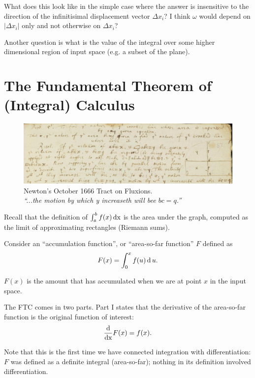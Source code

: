 \documentclass[12pt]{article}
\renewcommand{\ddx}{\frac{\d}{\dx}}
\begin{document}
What does this look like in the simple case where the answer is insensitive to
the direction of the infinitisimal displacement vector $\Delta x_i$? I think
$\omega$ would depend on $|\Delta x_i|$ only and not otherwise on $\Delta x_i$?

Another question is what is the value of the integral over some higher
dimensional region of input space (e.g. a subset of the plane).

\newpage
\section{The Fundamental Theorem of (Integral) Calculus}

\begin{figure}[h]
\centering
\includegraphics[width=500pt]{img/newton-october-1666-tract-ftc.png}
\captionsetup{labelformat=empty,justification=centering}
\caption[xxx]{Newton's October 1666 Tract on Fluxions.\\
  \emph{``...the motion by which y increaseth will bee $bc = q$.''}}
\end{figure}

Recall that the definition of $\int_a^b f(x) \operatorname{\text{dx}}$ is the area under the graph,
computed as the limit of approximating rectangles (Riemann sums).

Consider an ``accumulation function'', or ``area-so-far function'' $F$ defined
as
\begin{align*}
  F(x) = \int_0^x f(u) \operatorname{\text{d}} u.
\end{align*}

$F(x)$ is the amount that has accumulated when we are at point $x$ in the
input space.

The FTC comes in two parts. Part I states that the derivative of the
area-so-far function is the original function of interest:
\begin{align*}
  \ddx F(x) = f(x).
\end{align*}

Note that this is the first time we have connected integration with
differentiation: $F$ was defined as a definite integral (area-so-far); nothing
in its definition involved differentiation.
\end{document}
